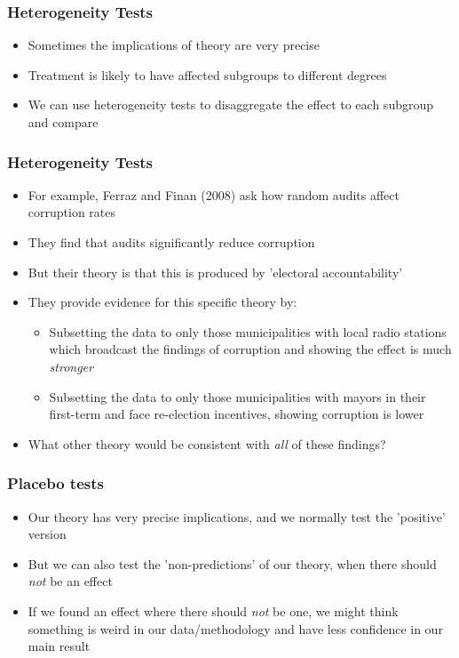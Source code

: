 \documentclass[xcolor=x11names,compress]{beamer}\usepackage[]{graphicx}\usepackage[]{color}
\renewcommand{\(}{\begin{columns}}
\renewcommand{\)}{\end{columns}}
\newcommand{\<}[1]{\begin{column}{#1}}
\renewcommand{\>}{\end{column}}
\begin{document}


\begin{frame}
\frametitle{Heterogeneity Tests}
\begin{itemize}
\item Sometimes the implications of theory are very precise
\item Treatment is likely to have affected subgroups to different degrees
\item We can use heterogeneity tests to disaggregate the effect to each subgroup and compare
\end{itemize}
\end{frame}

\begin{frame}
\frametitle{Heterogeneity Tests}
\begin{itemize}
\item For example, Ferraz and Finan (2008) ask how random audits affect corruption rates
\item They find that audits significantly reduce corruption
\item But their theory is that this is produced by 'electoral accountability' 
\item They provide evidence for this specific theory by:
\begin{itemize}
\item Subsetting the data to only those municipalities with local radio stations which broadcast the findings of corruption and showing the effect is much \textit{stronger}
\item Subsetting the data to only those municipalities with mayors in their first-term and face re-election incentives, showing corruption is lower
\end{itemize}
\item What other theory would be consistent with \textit{all} of these findings?
\end{itemize}
\end{frame}

\begin{frame}
\frametitle{Placebo tests}
\begin{itemize}
\item Our theory has very precise implications, and we normally test the 'positive' version
\item But we can also test the 'non-predictions' of our theory, when there should \textit{not} be an effect
\item If we found an effect where there should \textit{not} be one, we might think something is weird in our data/methodology and have less confidence in our main result
\end{itemize}
\end{frame}
\end{document}
